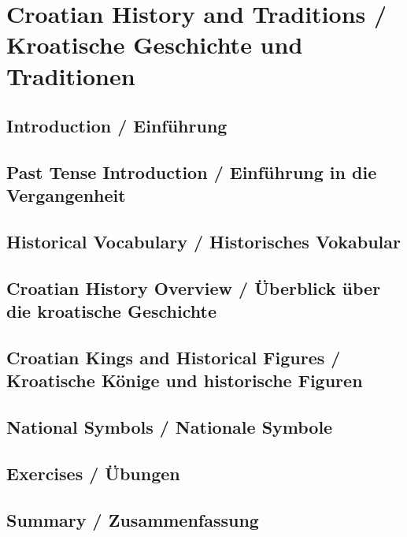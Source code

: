 \chapter{Croatian History and Traditions / Kroatische Geschichte und Traditionen}

\section{Introduction / Einführung}

\section{Past Tense Introduction / Einführung in die Vergangenheit}

\section{Historical Vocabulary / Historisches Vokabular}

\section{Croatian History Overview / Überblick über die kroatische Geschichte}

\section{Croatian Kings and Historical Figures / Kroatische Könige und historische Figuren}

\section{National Symbols / Nationale Symbole}

\section{Exercises / Übungen}

\section{Summary / Zusammenfassung}
